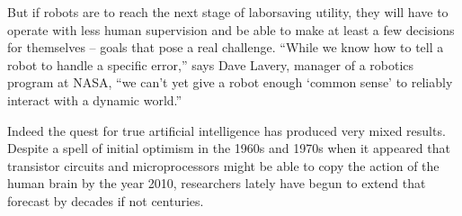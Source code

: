 But if robots are to reach the next stage of laborsaving utility, they will have to operate with less human supervision and be able to make at least a few decisions for themselves -- goals that pose a real challenge. “While we know how to tell a robot to handle a specific error,” says Dave Lavery, manager of a robotics program at NASA, “we can’t yet give a robot enough ‘common sense’ to reliably interact with a dynamic world.”

Indeed the quest for true artificial intelligence has produced very mixed results. Despite a spell of initial optimism in the 1960s and 1970s when it appeared that transistor circuits and microprocessors might be able to copy the action of the human brain by the year 2010, researchers lately have begun to extend that forecast by decades if not centuries.

